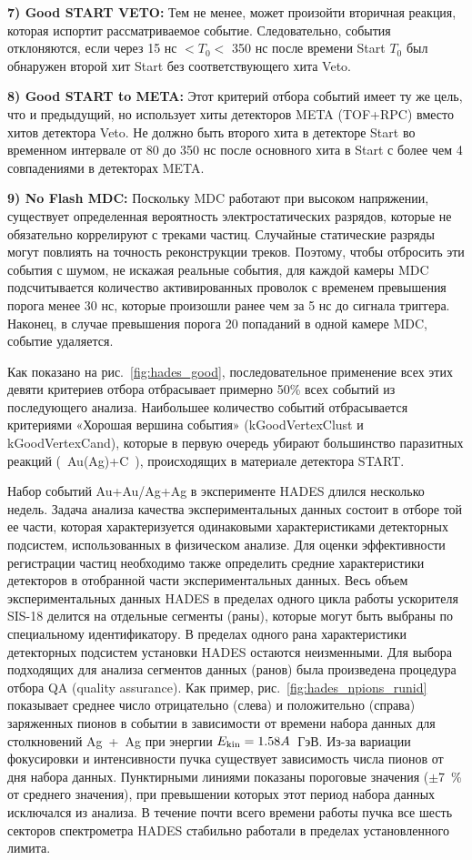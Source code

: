 {\bf 7)  Good START VETO:}  Тем не менее, может произойти вторичная реакция, которая испортит рассматриваемое событие.
Следовательно, события отклоняются, если через 15 нс $< T_0 <$ 350 нс после времени Start $T_0$ был обнаружен второй хит Start без соответствующего хита Veto.

{\bf 8) Good START to META:} Этот критерий отбора событий имеет ту же цель, что и предыдущий, но использует хиты детекторов META (TOF+RPC) вместо хитов детектора Veto. 
Не должно быть второго хита в детекторе Start во временном интервале от 80 до 350 нс после основного хита в Start с более чем 4 совпадениями в детекторах META.

{\bf 9) No Flash MDC:} Поскольку MDC работают при высоком напряжении, существует определенная вероятность электростатических разрядов, которые не обязательно коррелируют с треками частиц. 
Случайные статические разряды могут повлиять на точность реконструкции треков. 
Поэтому, чтобы отбросить эти события с шумом, не искажая реальные события, для каждой камеры MDC подсчитывается количество активированных проволок
с временем превышения порога менее 30 нс, которые произошли ранее чем за 5 нс до сигнала триггера. Наконец, в случае превышения порога 20 попаданий в одной камере MDC, событие удаляется.

Как показано на рис.~\ref{fig:hades_good}, последовательное применение всех этих девяти критериев отбора отбрасывает примерно 50\% всех событий из последующего анализа.
Наибольшее количество событий отбрасывается критериями «Хорошая вершина события» (kGoodVertexClust и kGoodVertexCand), которые в первую очередь убирают большинство паразитных реакций (~Au(Ag)+C~), происходящих в материале детектора START.

Набор событий Au+Au/Ag+Ag в эксперименте HADES длился несколько недель. 
Задача анализа качества экспериментальных данных состоит в отборе той ее части, которая характеризуется одинаковыми характеристиками детекторных подсистем, использованных в физическом анализе. 
Для оценки эффективности регистрации частиц необходимо также определить средние характеристики детекторов в отобранной части экспериментальных данных. 
Весь объем экспериментальных данных HADES в пределах одного цикла работы ускорителя SIS-18 делится на отдельные сегменты (раны), которые могут быть выбраны по специальному идентификатору.
В пределах одного рана характеристики детекторных подсистем установки HADES остаются неизменными.
Для выбора подходящих для анализа сегментов данных (ранов) была произведена процедура отбора QA (quality assurance).
Как пример, рис.~\ref{fig:hades_npions_runid} показывает среднее число отрицательно (слева) и положительно (справа) заряженных пионов в событии
в зависимости от времени набора данных для столкновений Ag~+~Ag при энергии $E_{\rm kin}=1.58A$~ГэВ. 
Из-за вариации фокусировки и интенсивности пучка существует зависимость числа пионов от дня набора данных. 
Пунктирными линиями показаны пороговые значения ($\pm $7~\% от среднего значения), при превышении которых этот период набора данных исключался из анализа. 
В течение почти всего времени работы пучка все шесть секторов спектрометра HADES стабильно работали в пределах установленного лимита.

